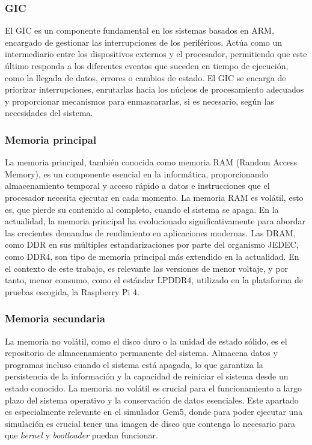 \subsubsection{GIC}
\label{subs:gic}
El \ac{GIC} es un componente fundamental en los sistemas basados en \ac{ARM}, encargado de gestionar las interrupciones de los periféricos. Actúa como un intermediario entre los dispositivos externos y el procesador, permitiendo que este último responda a los diferentes eventos que suceden en tiempo de ejecución, como la llegada de datos, errores o cambios de estado. El GIC se encarga de priorizar interrupciones, enrutarlas hacia los núcleos de procesamiento adecuados y proporcionar mecanismos para enmascararlas, si es necesario, según las necesidades del sistema. 

\subsubsection{Memoria principal}
\label{subs:ram}
La memoria principal, también conocida como memoria RAM (Random Access Memory), es un componente esencial en la informática, proporcionando almacenamiento temporal y acceso rápido a datos e instrucciones que el procesador necesita ejecutar en cada momento. La memoria RAM es volátil, esto es, que pierde su contenido al completo, cuando el sistema se apaga. En la actualidad, la memoria principal ha evolucionado significativamente para abordar las crecientes demandas de rendimiento en aplicaciones modernas. Las \ac{DRAM}, como \ac{DDR} en sus múltiples estandarizaciones por parte del organismo \ac{JEDEC}, como \ac{DDR4}, son tipo de memoria principal más extendido en la actualidad. En el contexto de este trabajo, es relevante las versiones de menor voltaje, y por tanto, menor consumo, como el estándar \ac{LPDDR4}, utilizado en la plataforma de pruebas escogida, la Raspberry Pi 4.

\subsubsection{Memoria secundaria}
\label{subs:discoduro}
La memoria no volátil, como el disco duro o la unidad de estado sólido, es el repositorio de almacenamiento permanente del sistema. Almacena datos y programas incluso cuando el sistema está apagada, lo que garantiza la persistencia de la información y la capacidad de reiniciar el sistema desde un estado conocido. La memoria no volátil es crucial para el funcionamiento a largo plazo del sistema operativo y la conservación de datos esenciales. Este apartado es especialmente relevante en el simulador Gem5, donde para poder ejecutar una simulación es crucial tener una imagen de disco que contenga lo necesario para que \textit{kernel} y \textit{bootloader} puedan funcionar. 

